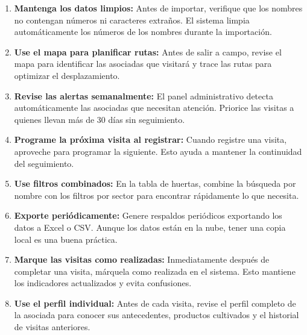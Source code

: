 \documentclass[12pt]{article}
\begin{document}
\begin{tcolorbox}[colback=green!5, colframe=greenaccent, arc=6pt, title={\large\textbf{Mejores prácticas}}]

\begin{enumerate}
  \item \textbf{Mantenga los datos limpios:} Antes de importar, verifique que los nombres no contengan números ni caracteres extraños. El sistema limpia automáticamente los números de los nombres durante la importación.

  \item \textbf{Use el mapa para planificar rutas:} Antes de salir a campo, revise el mapa para identificar las asociadas que visitará y trace las rutas para optimizar el desplazamiento.

  \item \textbf{Revise las alertas semanalmente:} El panel administrativo detecta automáticamente las asociadas que necesitan atención. Priorice las visitas a quienes llevan más de 30 días sin seguimiento.

  \item \textbf{Programe la próxima visita al registrar:} Cuando registre una visita, aproveche para programar la siguiente. Esto ayuda a mantener la continuidad del seguimiento.

  \item \textbf{Use filtros combinados:} En la tabla de huertas, combine la búsqueda por nombre con los filtros por sector para encontrar rápidamente lo que necesita.

  \item \textbf{Exporte periódicamente:} Genere respaldos periódicos exportando los datos a Excel o CSV. Aunque los datos están en la nube, tener una copia local es una buena práctica.

  \item \textbf{Marque las visitas como realizadas:} Inmediatamente después de completar una visita, márquela como realizada en el sistema. Esto mantiene los indicadores actualizados y evita confusiones.

  \item \textbf{Use el perfil individual:} Antes de cada visita, revise el perfil completo de la asociada para conocer sus antecedentes, productos cultivados y el historial de visitas anteriores.
\end{enumerate}

\end{tcolorbox}

\end{document}
